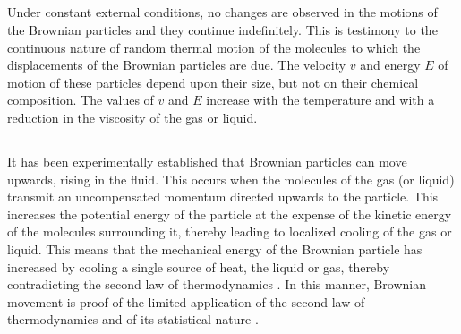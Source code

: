 \subsection{}\label{11.7.2} Under constant external conditions, no changes are observed in the motions of the Brownian particles and they continue indefinitely. This is testimony to the continuous na­ture of random thermal motion of the molecules to which the displacements of the Brownian particles are due. The velocity $v$ and energy $E$ of motion of these particles depend upon their size, but not on their chemical composition. The values of $v$ and $E$ increase with the temperature and with a reduction in the viscosity of the gas or liquid.

\subsection{}\label{11.7.3} It has been experimentally established that Brownian particles can move upwards, rising in the fluid. This occurs when the molecules of the gas (or liquid) transmit an uncompensated momentum directed upwards to the particle. This increases the potential energy of the particle at the expense of the kinetic energy of the molecules surrounding it, thereby leading to localized cooling of the gas or liquid. This means that the mechanical energy of the Brownian particle has increased by cooling a single source of heat, the liquid or gas, thereby contradicting the second law of thermodynamics . In this manner, Brownian movement is proof of the limited appli­cation of the second law of thermodynamics and of its statisti­cal nature .

